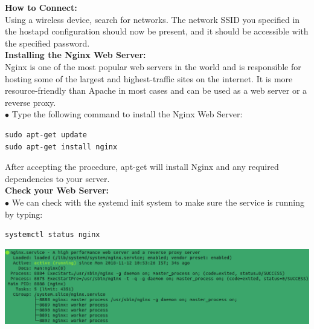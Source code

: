 \documentclass[journal,12pt,onecolumn]{IEEEtran}
\begin{document}
\begin{flushleft}
\textbf{How to Connect:} \\
Using a wireless device, search for networks. The network SSID you specified in the hostapd configuration should now be present, and it should be accessible with the specified password.\\ 
\bigskip
\textbf{Installing the Nginx Web Server:} \\
Nginx is one of the most popular web servers in the world and is responsible for hosting some of the largest and highest-traffic sites on the internet. It is more resource-friendly than Apache in most cases and can be used as a web server or a reverse proxy.\\
\bigskip
$\bullet$ Type the following command to install the Nginx Web Server: \\
\bigskip
\begin{lstlisting}[frame=single,linewidth=10cm,breaklines=true]
sudo apt-get update
sudo apt-get install nginx
\end{lstlisting}
\bigskip
After accepting the procedure, apt-get will install Nginx and any required dependencies to your server.\\
\bigskip
\textbf{Check your Web Server:} \\
\bigskip
$\bullet$ We can check with the systemd init system to make sure the service is running by typing:\\
\bigskip
\begin{lstlisting}[frame=single,linewidth=7cm,breaklines=true]
systemctl status nginx
\end{lstlisting}
\bigskip
\includegraphics[scale=.5]{img1.eps}


\end{flushleft}
\end{document}
